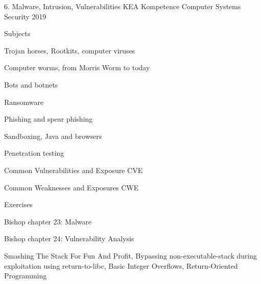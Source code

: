 \documentclass[Screen16to9,17pt]{foils}
\begin{document}
\mytitlepage
{6. Malware, Intrusion, Vulnerabilities}
{KEA Kompetence Computer Systems Security 2019}



\begin{list1}
\item Subjects
\begin{list2}
  \item Trojan horses, Rootkits, computer viruses
  \item Computer worms, from Morris Worm to today
  \item Bots and botnets
  \item Ransomware
  \item Phishing and spear phishing
  \item Sandboxing, Java and browsers
  \item Penetration testing
  \item Common Vulnerabilities and Exposure CVE
  \item Common Weaknesses and Exposures CWE
\end{list2}
\item Exercises
\begin{list2}
\item
\item
\end{list2}
\end{list1}




\begin{list1}
\item Bishop chapter 23: Malware
\item Bishop chapter 24: Vulnerability Analysis
\item Smashing The Stack For Fun And Profit, Bypassing non-executable-stack during exploitation using return-to-libc, Basic Integer Overflows, Return-Oriented Programming

\end{list1}





















\slidenext
\end{document}
